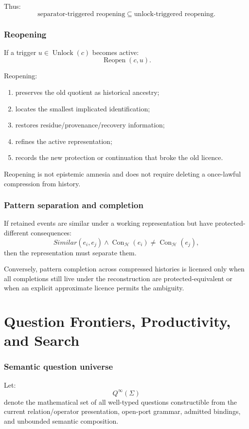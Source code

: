 \documentclass[11pt,oneside]{article}
\newcommand{\Con}{\operatorname{Con}}
\newcommand{\Unlock}{\operatorname{Unlock}}
\newcommand{\Reopen}{\operatorname{Reopen}}
\begin{document}
Thus:
\[
\boxed{
\text{separator-triggered reopening}
\subseteq
\text{unlock-triggered reopening}.
}
\]

\section{Reopening}

If a trigger \(u\in\Unlock(c)\) becomes active:
\[
\boxed{
\Reopen(c,u).
}
\]

Reopening:
\begin{enumerate}
\item preserves the old quotient as historical ancestry;
\item locates the smallest implicated identification;
\item restores residue/provenance/recovery information;
\item refines the active representation;
\item records the new protection or continuation that broke the old licence.
\end{enumerate}

Reopening is not epistemic amnesia and does not require deleting a once-lawful compression from history.

\section{Pattern separation and completion}

If retained events are similar under a working representation but have protected-different consequences:
\[
Similar(e_i,e_j)
\land
\Con_{\mathcal H}(e_i)\neq\Con_{\mathcal H}(e_j),
\]
then the representation must separate them.

Conversely, pattern completion across compressed histories is licensed only when all completions still live under the reconstruction are protected-equivalent or when an explicit approximate licence permits the ambiguity.

\part{Question Frontiers, Productivity, and Search}

\section{Semantic question universe}

Let:
\[
Q^\infty(\Sigma)
\]
denote the mathematical set of all well-typed questions constructible from the current relation/operator presentation, open-port grammar, admitted bindings, and unbounded semantic composition.
\end{document}
